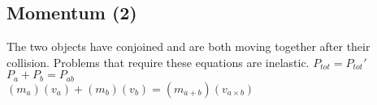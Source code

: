 \begin{adjustwidth}{1cm}{0pt}
    \subsection{Momentum (2)}
    \begin{flushleft}
        The two objects have conjoined and are both moving together after their collision. Problems that require these equations are inelastic.\newline\newline
        $P_{tot} = P_{tot}\prime$ \\
        \vspace*{10pt}
        $P_{a} + P_{b} = P_{ab}$ \\
        \vspace*{10pt}
        $(m_{a})(v_{a}) + (m_{b})(v_{b}) = (m_{a + b})(v_{a\times b})$
    \end{flushleft}
\end{adjustwidth}